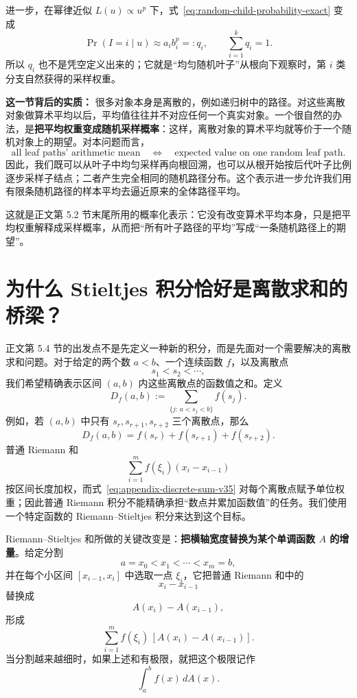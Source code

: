 \documentclass[11pt,a4paper]{article}
\begin{document}
进一步，在幂律近似 $L(u)\propto u^p$ 下，式~\eqref{eq:random-child-probability-exact} 变成
\begin{equation}
\Pr(I=i\mid u)
\approx a_i b_i^p
=:q_i,
\qquad \sum_{i=1}^{k}q_i=1.
\label{eq:random-child-probability}
\end{equation}
所以 $q_i$ 也不是凭空定义出来的；它就是“均匀随机叶子”从根向下观察时，第 $i$ 类分支自然获得的采样权重。

\begin{tcolorbox}
\textbf{这一节背后的实质：}
很多对象本身是离散的，例如递归树中的路径。对这些离散对象做算术平均以后，平均值往往并不对应任何一个真实对象。一个很自然的办法，是\textbf{把平均权重变成随机采样概率}：这样，离散对象的算术平均就等价于一个随机对象上的期望。对本问题而言，
\[
\text{all leaf paths' arithmetic mean}
\quad\Longleftrightarrow\quad
\text{expected value on one random leaf path}.
\]
因此，我们既可以从叶子中均匀采样再向根回溯，也可以从根开始按后代叶子比例逐步采样子结点；二者产生完全相同的随机路径分布。这个表示进一步允许我们用有限条随机路径的样本平均去逼近原来的全体路径平均。
\end{tcolorbox}

这就是正文第 5.2 节末尾所用的概率化表示：它没有改变算术平均本身，只是把平均权重解释成采样概率，从而把“所有叶子路径的平均”写成“一条随机路径上的期望”。

\section{为什么 Stieltjes 积分恰好是离散求和的桥梁？}
正文第 5.4 节的出发点不是先定义一种新的积分，而是先面对一个需要解决的离散求和问题。对于给定的两个数 $a<b$、一个连续函数 $f$，以及离散点
\[
s_1<s_2<\cdots,
\]
我们希望精确表示区间 $(a,b)$ 内这些离散点的函数值之和。定义
\begin{equation}
D_f(a,b)
:=
\sum_{\{j:\,a<s_j<b\}} f(s_j).
\label{eq:appendix-discrete-sum-v35}
\end{equation}
例如，若 $(a,b)$ 中只有 $s_r,s_{r+1},s_{r+2}$ 三个离散点，那么
\[
D_f(a,b)=f(s_r)+f(s_{r+1})+f(s_{r+2}).
\]
普通 Riemann 和
\[
\sum_{i=1}^{m} f(\xi_i)(x_i-x_{i-1})
\]
按区间长度加权，而式~\eqref{eq:appendix-discrete-sum-v35} 对每个离散点赋予单位权重；因此普通 Riemann 积分不能精确承担“数点并累加函数值”的任务。我们使用一个特定函数的 Riemann--Stieltjes 积分来达到这个目标。

Riemann--Stieltjes 和所做的关键改变是：\textbf{把横轴宽度替换为某个单调函数 $A$ 的增量}。给定分割
\[
a=x_0<x_1<\cdots<x_m=b,
\]
并在每个小区间 $[x_{i-1},x_i]$ 中选取一点 $\xi_i$，它把普通 Riemann 和中的
\[
x_i-x_{i-1}
\]
替换成
\[
A(x_i)-A(x_{i-1}),
\]
形成
\[
\sum_{i=1}^{m} f(\xi_i)\,[A(x_i)-A(x_{i-1})].
\]
当分割越来越细时，如果上述和有极限，就把这个极限记作
\[
\int_a^b f(x)\,dA(x).
\]
\end{document}
